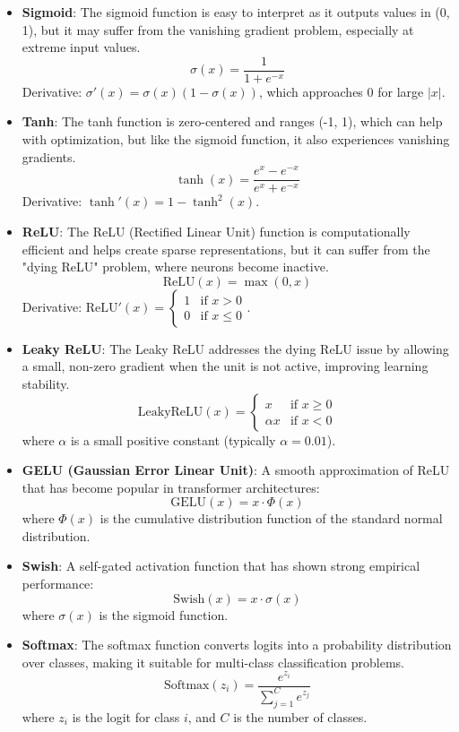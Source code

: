 \begin{itemize}
	\item \textbf{Sigmoid}: The sigmoid function is easy to interpret as it outputs values in (0, 1), but it may suffer from the vanishing gradient problem, especially at extreme input values.
	      \[
		      \sigma(x) = \frac{1}{1 + e^{-x}}
	      \]
	      Derivative: \(\sigma'(x) = \sigma(x)(1-\sigma(x))\), which approaches 0 for large \(|x|\).

	\item \textbf{Tanh}: The tanh function is zero-centered and ranges (-1, 1), which can help with optimization, but like the sigmoid function, it also experiences vanishing gradients.
	      \[
		      \tanh(x) = \frac{e^x - e^{-x}}{e^x + e^{-x}}
	      \]
	      Derivative: \(\tanh'(x) = 1 - \tanh^2(x)\).

	\item \textbf{ReLU}: The ReLU (Rectified Linear Unit) function is computationally efficient and helps create sparse representations, but it can suffer from the "dying ReLU" problem, where neurons become inactive.
	      \[
		      \text{ReLU}(x) = \max(0, x)
	      \]
	      Derivative: \(\text{ReLU}'(x) = \begin{cases} 1 & \text{if } x > 0 \\ 0 & \text{if } x \leq 0 \end{cases}\).

	\item \textbf{Leaky ReLU}: The Leaky ReLU addresses the dying ReLU issue by allowing a small, non-zero gradient when the unit is not active, improving learning stability.
	      \[
		      \text{LeakyReLU}(x) =
		      \begin{cases}
			      x        & \text{if } x \geq 0 \\
			      \alpha x & \text{if } x < 0
		      \end{cases}
	      \]
	      where \( \alpha \) is a small positive constant (typically \( \alpha = 0.01 \)).

	\item \textbf{GELU (Gaussian Error Linear Unit)}: A smooth approximation of ReLU that has become popular in transformer architectures:
	      \[
		      \text{GELU}(x) = x \cdot \Phi(x)
	      \]
	      where \(\Phi(x)\) is the cumulative distribution function of the standard normal distribution.

	\item \textbf{Swish}: A self-gated activation function that has shown strong empirical performance:
	      \[
		      \text{Swish}(x) = x \cdot \sigma(x)
	      \]
	      where \(\sigma(x)\) is the sigmoid function.

	\item \textbf{Softmax}: The softmax function converts logits into a probability distribution over classes, making it suitable for multi-class classification problems.
	      \[
		      \text{Softmax}(z_i) = \frac{e^{z_i}}{\sum_{j=1}^{C} e^{z_j}}
	      \]
	      where \( z_i \) is the logit for class \( i \), and \( C \) is the number of classes.
\end{itemize}

